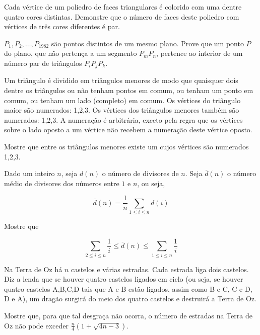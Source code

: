 \begin{questao}
  Cada vértice de um poliedro de faces triangulares é colorido com uma
  dentre quatro cores distintas. Demonstre que o número de faces deste
  poliedro com vértices de três cores diferentes é par.
\end{questao}

\begin{questao}
  $P_1,P_2,\ldots,P_{1982}$ são pontos distintos de um mesmo
  plano. Prove que um ponto $P$ do plano, que não pertença a um
  segmento $P_mP_n$, pertence ao interior de um número par de
  triângulos $P_iP_jP_k$.
\end{questao}

\begin{questao}
  Um triângulo é dividido em triângulos menores de modo que quaisquer
  dois dentre os triângulos ou não tenham pontos em comum, ou tenham
  um ponto em comum, ou tenham um lado (completo) em comum. Os
  vértices do triângulo maior são numerados: 1,2,3. Os vértices dos
  triângulos menores também são numerados: 1,2,3. A numeração é
  arbitrária, exceto pela regra que os vértices sobre o lado oposto a
  um vértice não recebem a numeração deste vértice oposto.

  Mostre que entre os triângulos menores existe um cujos vértices são
  numerados 1,2,3.
\end{questao}

\begin{questao}
  Dado um inteiro $n$, seja $d(n)$ o número de divisores de
  $n$. Seja $\overbar{d}(n)$ o número médio de divisores dos
  números entre $1$ e $n$, ou seja, 

  $$ \overbar{d}(n) = \frac{1}{n}\sum_{1 \leq i \leq n}{d(i)} $$

  Mostre que 

  $$ \sum_{2 \leq i \leq n}{\frac{1}{i}} \leq \overbar{d}(n) \leq
  \sum_{1 \leq i \leq n}{\frac{1}{i}} $$
\end{questao}

\begin{questao}
  Na Terra de Oz há $n$ castelos e várias estradas. Cada estrada
  liga dois castelos. Diz a lenda que se houver quatro castelos
  ligados em ciclo (ou seja, se houver quatro castelos A,B,C,D tais
  que A e B estão ligados, assim como B e C, C e D, D e A), um dragão
  surgirá do meio dos quatro castelos e destruirá a Terra de Oz.

  Mostre que, para que tal desgraça não ocorra, o número de estradas
  na Terra de Oz não pode exceder $\frac{n}{4}(1+\sqrt{4n-3})$.
\end{questao}

